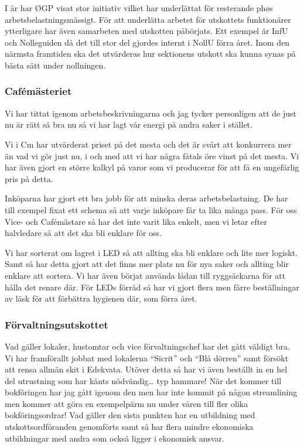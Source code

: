 \documentclass[../_main/handlingar.tex]{subfiles}
\begin{document}
I år har ØGP visat stor initiativ vilket har underlättat för resterande phøs arbetsbelastningsmässigt. För att underlätta arbetet för utskottets funktionärer ytterligare har även samarbeten med utskotten påbörjats. Ett exempel är InfU och Nolleguiden då det till stor del gjordes internt i NollU förra året. Inom den närmsta framtiden ska det utvärderas hur sektionens utskott ska kunna synas på bästa sätt under nollningen.

\newpage

\subsubsection*{Cafémästeriet}

Vi har tittat igenom arbetsbeskrivningarna och jag tycker personligen att de just nu är rätt så bra nu så vi har lagt vår energi på andra saker i stället.

Vi i Cm har utvärderat priset på det mesta och det är svårt att konkurrera mer än vad vi gör just nu, i och med att vi har några fåtals öre vinst på det mesta. Vi har även gjort en större kalkyl på varor som vi producerar för att få en ungefärlig pris på detta.

Inköparna har gjort ett bra jobb för att minska deras arbetsbelastning. De har till exempel fixat ett schema så att varje inköpare får ta lika många pass. För oss Vice- och Cafémästare så har det inte varit lika enkelt, men vi letar efter halvledare så att det ska bli enklare för oss.

Vi har sorterat om lagret i LED så att allting ska bli enklare och lite mer logiskt. Samt så har detta gjort att det finns mer plats nu för nya saker och allting blir enklare att sortera. Vi har även börjat använda lådan till ryggsäckarna för att hålla det renare där. För LEDs förråd så har vi gjort flera men färre beställningar av läsk för att förbättra hygienen där, som förra året.


\subsubsection*{Förvaltningsutskottet}

Vad gäller lokaler, hustomtar och vice förvaltningschef har det gått väldigt bra. Vi har framförallt jobbat med lokalerna “Sicrit” och “Blå dörren” samt försökt att rensa allmän skit i Edekvata. Utöver detta så har vi även beställt in en hel del utrustning som har känts nödvändig… typ hammare!
När det kommer till bokföringen har jag gått igenom den men har inte kommit på någon streamlining men kommer att göra en exempelpärm nu under våren till fler olika bokföringsordrar!
Vad gäller den sista punkten har en utbildning med utskottsordföranden genomförts samt så har flera mindre ekonomiska utbildningar med andra som också ligger i ekonomisk ansvar.
\end{document}
